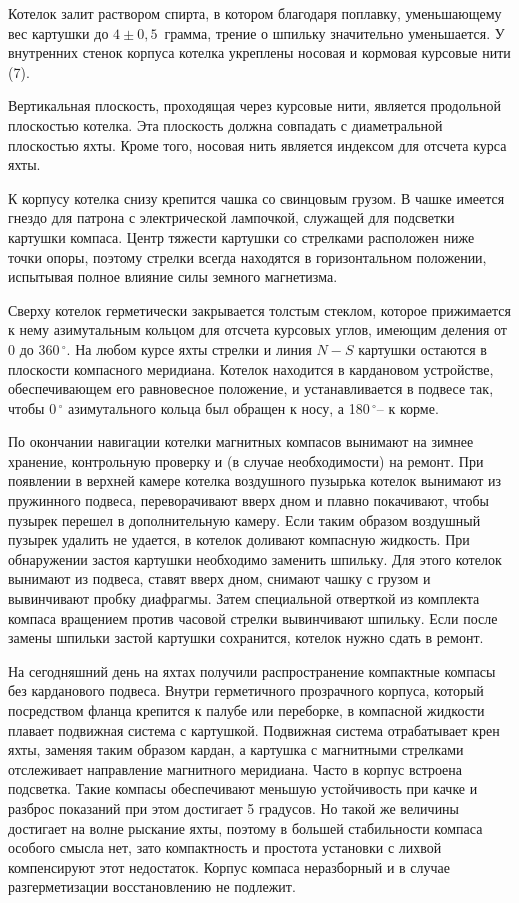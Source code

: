 \documentclass[a4paper, 12pt, twoside, final, book, russian, fittopage, cyremdash]{ncc}
\newcommand{\gr}{\ensuremath{\,^\circ}\xspace}
\begin{document}
Котелок залит раствором спирта, в котором благодаря поплавку, уменьшающему вес картушки до $4 \pm 0,5$~грамма, трение о шпильку значительно уменьшается. У внутренних стенок корпуса котелка укреплены носовая и кормовая курсовые нити (7).

Вертикальная плоскость, проходящая через курсовые нити, является продольной плоскостью котелка. Эта плоскость должна совпадать с диаметральной плоскостью яхты. Кроме того, носовая нить является индексом для отсчета курса яхты. 

К корпусу котелка снизу крепится чашка со свинцовым грузом. В чашке имеется гнездо для патрона с электрической лампочкой, служащей для подсветки картушки компаса. Центр тяжести картушки со стрелками расположен ниже точки опоры, поэтому стрелки всегда находятся в горизонтальном положении, испытывая полное влияние силы земного магнетизма. 

Сверху котелок герметически закрывается толстым стеклом, которое прижимается к нему азимутальным кольцом для отсчета курсовых углов, имеющим деления от 0 до 360\gr. На любом курсе яхты стрелки и линия $N-S$ картушки остаются в плоскости компасного меридиана. Котелок находится в кардановом устройстве, обеспечивающем его равновесное положение, и устанавливается в подвесе так, чтобы 0\gr азимутального кольца был обращен к носу, а 180\gr \--- к корме. 

По окончании навигации котелки магнитных компасов вынимают на зимнее хранение, контрольную проверку и (в случае необходимости) на ремонт. При появлении в верхней камере котелка воздушного пузырька котелок вынимают из пружинного подвеса, переворачивают вверх дном и плавно покачивают, чтобы пузырек перешел в дополнительную камеру. Если таким образом воздушный пузырек удалить не удается, в котелок доливают компасную жидкость. При обнаружении застоя картушки необходимо заменить шпильку. Для этого котелок вынимают из подвеса, ставят вверх дном, снимают чашку с грузом и вывинчивают пробку диафрагмы. Затем специальной отверткой из комплекта компаса вращением против часовой стрелки вывинчивают шпильку. Если после замены шпильки застой картушки сохранится, котелок нужно сдать в ремонт. 

На сегодняшний день на яхтах получили распространение компактные компасы без карданового подвеса. Внутри герметичного прозрачного корпуса, который посредством фланца крепится к палубе или переборке, в компасной жидкости плавает подвижная система с картушкой. Подвижная система отрабатывает крен яхты, заменяя таким образом кардан, а картушка с магнитными стрелками отслеживает направление магнитного меридиана. Часто в корпус встроена подсветка. Такие компасы обеспечивают меньшую устойчивость при качке и разброс показаний при этом достигает 5 градусов. Но такой же величины достигает на волне рыскание яхты, поэтому в большей стабильности компаса особого смысла нет, зато компактность и простота установки с лихвой компенсируют этот недостаток. Корпус компаса неразборный и в случае разгерметизации восстановлению не подлежит. 
\end{document}
